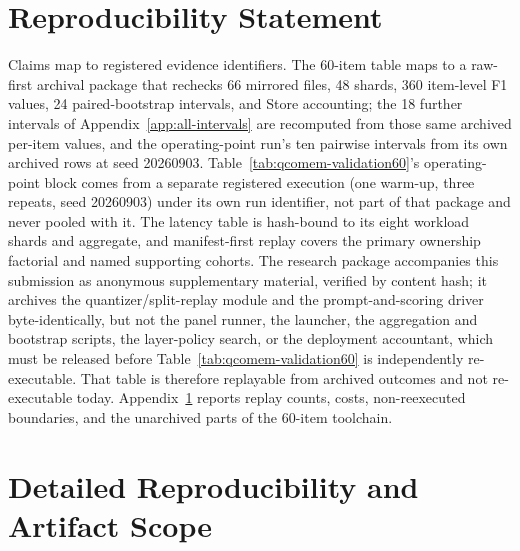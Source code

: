 \documentclass{article}
\begin{document}
\section*{Reproducibility Statement}
Claims map to registered evidence identifiers. The 60-item table maps to a
raw-first archival package that rechecks 66 mirrored files, 48 shards, 360
item-level F1 values, 24 paired-bootstrap intervals, and Store accounting; the
18 further intervals of Appendix~\ref{app:all-intervals} are recomputed from
those same archived per-item values, and the operating-point run's ten pairwise
intervals from its own archived rows at seed 20260903.
Table~\ref{tab:qcomem-validation60}'s operating-point block comes from a
separate registered execution (one warm-up, three repeats, seed 20260903) under
its own run identifier, not part of that package and never pooled with it. The
latency table is hash-bound to its eight workload shards and aggregate, and
manifest-first replay covers the primary ownership factorial and named
supporting cohorts. The research package accompanies this submission as
anonymous supplementary material, verified by content hash; it archives the
quantizer/split-replay module and the prompt-and-scoring driver
byte-identically, but not the panel runner, the launcher, the aggregation and
bootstrap scripts, the layer-policy search, or the deployment accountant, which
must be released before Table~\ref{tab:qcomem-validation60} is independently
re-executable. That table is therefore replayable from archived outcomes and not
re-executable today. Appendix~\ref{app:reproducibility} reports replay counts,
costs, non-reexecuted boundaries, and the unarchived parts of the 60-item
toolchain.




\appendix

\section{Detailed Reproducibility and Artifact Scope}
\label{app:reproducibility}
\end{document}
